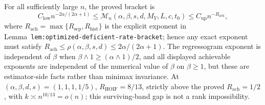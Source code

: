 For all sufficiently large \(n\), the proved bracket is \[C_{\mathrm{low}}n^{-2\alpha/(2\alpha+1)}\le\mathcal M_n(\alpha,\beta,s,d,M_Y,L,c,t_0)\le C_{\mathrm{up}}n^{-R_{\mathrm{ach}}},\] where \(R_{\mathrm{ach}}=\max\{R_{\mathrm{sep}},R_{\mathrm{hist}}\}\) is the explicit exponent in Lemma~\texttt{lem:optimized-deficient-rate-bracket}; hence any exact exponent must satisfy \(R_{\mathrm{ach}}\le\rho(\alpha,\beta,s,d)\le2\alpha/(2\alpha+1)\). The regressogram exponent is independent of \(\beta\) when \(\beta\wedge1\ge(\alpha\wedge1)/2\), and all displayed achievable exponents are independent of the numerical value of \(\beta\) on \(\beta\ge1\), but these are estimator-side facts rather than minimax invariance. At \((\alpha,\beta,d,s)=(1,1,1,1/5)\), \(R_{\mathrm{HOIF}}=8/13\), strictly above the proved \(R_{\mathrm{ach}}=1/2\), with \(k\asymp n^{10/13}=o(n)\); this surviving-band gap is not a rank impossibility.